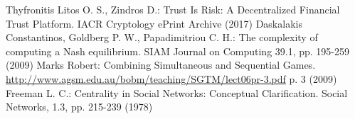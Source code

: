 \begin{thebibliography}{40}
  Thyfronitis Litos O. S., Zindros D.: Trust Is Risk: A Decentralized Financial Trust Platform. IACR Cryptology ePrint
  Archive (2017)
  Daskalakis Constantinos, Goldberg P. W., Papadimitriou C. H.: The complexity of computing a Nash equilibrium. SIAM Journal
  on Computing 39.1, pp. 195-259 (2009)
  Marks Robert: Combining Simultaneous and Sequential Games. \url{http://www.agsm.edu.au/bobm/teaching/SGTM/lect06pr-3.pdf} p.
  3 (2009)
  Freeman L. C.: Centrality in Social Networks: Conceptual Clarification. Social Networks, 1.3, pp. 215-239 (1978)

\end{thebibliography}
